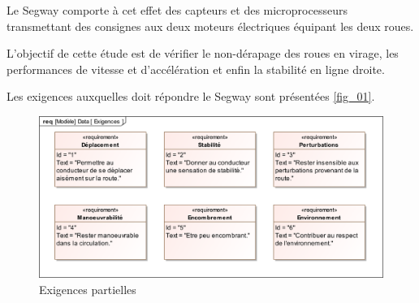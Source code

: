 \documentclass[10pt,fleqn]{article} %
\begin{document}
Le Segway comporte à cet effet des capteurs et des microprocesseurs transmettant des consignes aux deux moteurs électriques équipant les deux roues.
\begin{obj}
L’objectif de cette étude est de vérifier le non-dérapage des roues en virage, les performances de vitesse et d’accélération et enfin la stabilité en ligne droite.
\end{obj}
Les exigences auxquelles doit répondre le Segway sont présentées \autoref{fig_01}.



\begin{figure}[H]
\centering
\includegraphics[width=0.9\linewidth]{req_all}
\caption{Exigences partielles \label{fig_01}}
\end{figure}

%
\end{document}

